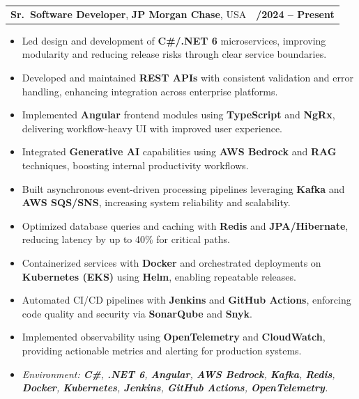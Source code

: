 \documentclass[letterpaper,11pt]{article}
\makeatletter
\newcommand{\resumeItem}[1]{
  \item\footnotesize{
    {#1 \vspace{-2pt}}
  }
}
\newcommand{\resumeSubheading}[4]{
  \vspace{-2pt}\item
    \begin{tabular*}{1.0\textwidth}[t]{l@{\extracolsep{\fill}}r}
      \textbf{\fontsize{10pt}{14pt}\selectfont #3}, \textbf{\fontsize{10pt}{14pt}\selectfont #1}, \fontsize{10pt}{14pt}\selectfont #4 & \textbf{\fontsize{10pt}{14pt}\selectfont #2} \\
    \end{tabular*}\vspace{-7pt}
}
\newcommand{\resumeItemListStart}{\begin{itemize}[leftmargin=*]}
\newcommand{\resumeItemListEnd}{\end{itemize}\vspace{-5pt}}
\makeatother
\begin{document}
\resumeSubheading
{JP Morgan Chase}{09/2024 -- Present}
{Sr.\ Software Developer}{USA}
\resumeItemListStart
  \resumeItem{Led design and development of \textbf{C\#/.NET 6} microservices, improving modularity and reducing release risks through clear service boundaries.}
  \resumeItem{Developed and maintained \textbf{REST APIs} with consistent validation and error handling, enhancing integration across enterprise platforms.}
  \resumeItem{Implemented \textbf{Angular} frontend modules using \textbf{TypeScript} and \textbf{NgRx}, delivering workflow-heavy UI with improved user experience.}
  \resumeItem{Integrated \textbf{Generative AI} capabilities using \textbf{AWS Bedrock} and \textbf{RAG} techniques, boosting internal productivity workflows.}
  \resumeItem{Built asynchronous event-driven processing pipelines leveraging \textbf{Kafka} and \textbf{AWS SQS/SNS}, increasing system reliability and scalability.}
  \resumeItem{Optimized database queries and caching with \textbf{Redis} and \textbf{JPA/Hibernate}, reducing latency by up to 40\% for critical paths.}
  \resumeItem{Containerized services with \textbf{Docker} and orchestrated deployments on \textbf{Kubernetes (EKS)} using \textbf{Helm}, enabling repeatable releases.}
  \resumeItem{Automated CI/CD pipelines with \textbf{Jenkins} and \textbf{GitHub Actions}, enforcing code quality and security via \textbf{SonarQube} and \textbf{Snyk}.}
  \resumeItem{Implemented observability using \textbf{OpenTelemetry} and \textbf{CloudWatch}, providing actionable metrics and alerting for production systems.}
  \resumeItem{\textit{Environment: \textbf{C\#}, \textbf{.NET 6}, \textbf{Angular}, \textbf{AWS Bedrock}, \textbf{Kafka}, \textbf{Redis}, \textbf{Docker}, \textbf{Kubernetes}, \textbf{Jenkins}, \textbf{GitHub Actions}, \textbf{OpenTelemetry}.}}
\resumeItemListEnd
\end{document}
